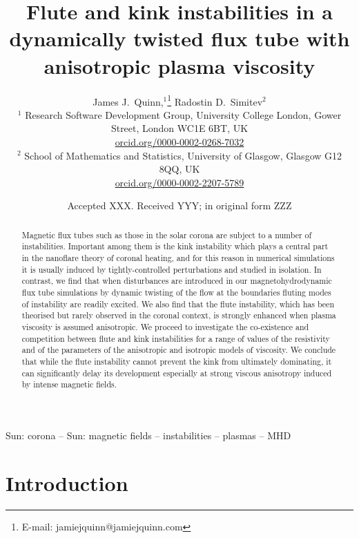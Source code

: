 \documentclass[fleqn,usenatbib]{mnras}
\title{Flute and kink instabilities in a dynamically twisted
    flux tube with anisotropic plasma viscosity}
\author[J.~Quinn and R.~Simitev]{
James J.~Quinn,$^{1}$\thanks{E-mail: jamiejquinn@jamiejquinn.com}
Radostin D.~Simitev$^{2}$
\\
$^{1}$ Research Software Development Group, University College London, Gower Street, London WC1E 6BT, UK \\
\href{https://orcid.org/0000-0002-0268-7032}{orcid.org/0000-0002-0268-7032} \\
$^2$ School of Mathematics and Statistics, University of Glasgow,
Glasgow G12 8QQ,
UK \\ \href{https://orcid.org/0000-0002-2207-5789}{orcid.org/0000-0002-2207-5789}\\
}
\date{Accepted XXX. Received YYY; in original form ZZZ}
\begin{document}
\label{firstpage}
\pagerange{\pageref{firstpage}--\pageref{lastpage}}
\maketitle


\graphicspath{{images/kink_instability_straight/}}

\begin{abstract}
Magnetic flux tubes such as those in the solar corona are subject to a
number of instabilities. Important among them is the kink instability
which plays a central part in the nanoflare theory of coronal heating,
and for this reason in numerical simulations it is usually induced by
tightly-controlled perturbations and studied in isolation. In
contrast, we find that when disturbances are introduced in our
magnetohydrodynamic flux tube simulations by dynamic twisting of the
flow at the boundaries fluting modes of instability are readily
excited. We also find that the flute instability, which has been
theorised but rarely observed in the coronal context,  is strongly
enhanced when plasma viscosity is assumed anisotropic.
We proceed to investigate the co-existence and competition between
flute and kink instabilities for a range of values of the resistivity
and of the parameters of the anisotropic and isotropic models of viscosity.
We conclude that while the flute instability cannot prevent the kink
from ultimately dominating, it can significantly delay its development
especially at strong viscous anisotropy induced by intense magnetic fields.
\end{abstract}

\begin{keywords}
Sun: corona -- Sun: magnetic fields -- instabilities -- plasmas -- MHD
\end{keywords}

\section{Introduction}
\end{document}
